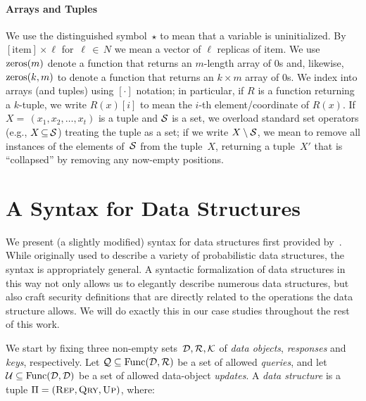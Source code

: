 \paragraph{Arrays and Tuples}

We use the distinguished symbol~$\star$ to mean that a variable is uninitialized. By $[\text{item}] \times \ell$ for~$\ell \,{\in}\, N$ we mean a vector of $\ell$ replicas of $\text{item}$. We use $\mathrm{zeros}(m)$ denote a function that returns an $m$-length array of 0s and, likewise, $\mathrm{zeros}(k,m)$ to denote a function that returns an $k \times m$ array of 0s.  We index into arrays (and tuples) using $[\cdot]$ notation; in particular, if $R$ is a function returning a $k$-tuple, we write $R(x)[i]$ to mean the $i$-th element/coordinate of $R(x)$.  If~$X{=}\,(x_1,x_2,\ldots,x_t)$ is a tuple and $\mathcal{S}$ is a set, we overload standard set operators (e.g., $X \,{\subseteq}\, \mathcal{S}$) treating the tuple as a set; if we write $X \setminus \mathcal{S}$, we mean to remove all instances of the elements of~$\mathcal{S}$ from the tuple~$X$, returning a tuple~$X'$ that is ``collapsed'' by removing any now-empty positions.

\section{A Syntax for Data Structures}\label{subsec:syntax}

We present (a slightly modified) syntax for data structures first provided by~\cite{clayton2019}. While originally used to describe a variety of probabilistic data structures, the syntax is appropriately general. A syntactic formalization of data structures in this way not only allows us to elegantly describe numerous data structures, but also craft security definitions that are directly related to the operations the data structure allows. We will do exactly this in our case studies throughout the rest of this work.

We start by fixing three non-empty sets~$\mathcal{D},\mathcal{R},\mathcal{K}$ of \emph{data objects}, \emph{responses} and \emph{keys}, respectively.  Let $\mathcal{Q}\subseteq \mathrm{Func}(\mathcal{D},\mathcal{R})$ be a set of allowed \emph{queries}, and let $\mathcal{U} \subseteq \mathrm{Func}(\mathcal{D},\mathcal{D})$ be a set of allowed data-object \emph{updates}.  A {\em data structure} is a tuple $\Pi =
(\textnormal{\textsc{Rep}},\textnormal{\textsc{Qry}},\textnormal{\textsc{Up}})$, where:

